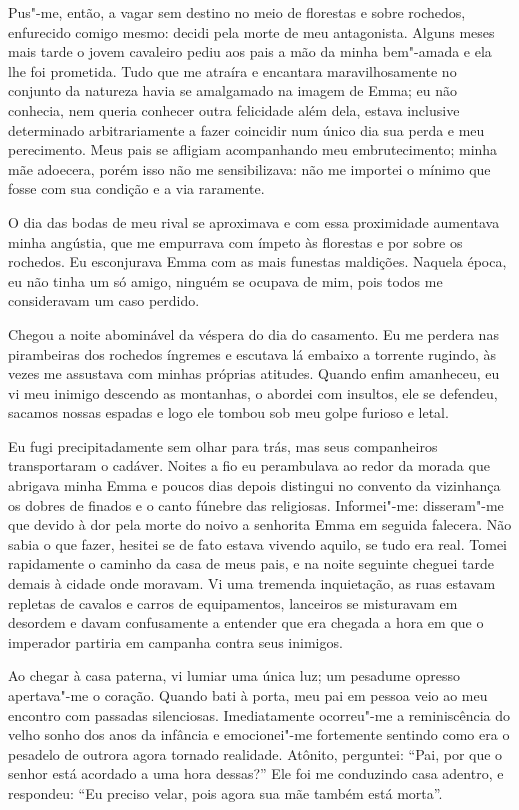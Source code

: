 Pus"-me, então, a vagar sem destino no meio de florestas e sobre
rochedos, enfurecido comigo mesmo: decidi pela morte de meu
antagonista. Alguns meses mais tarde o jovem cavaleiro pediu aos pais a
mão da minha bem"-amada e ela lhe foi prometida. Tudo que me atraíra e
encantara maravilhosamente no conjunto da natureza havia se amalgamado
na imagem de Emma; eu não conhecia, nem queria conhecer outra
felicidade além dela, estava inclusive determinado arbitrariamente a
fazer coincidir num único dia sua perda e meu perecimento. Meus pais se
afligiam acompanhando meu embrutecimento; minha mãe adoecera, porém
isso não me sensibilizava: não me importei o mínimo que fosse com sua
condição e a via raramente.

O dia das bodas de meu rival se aproximava e com essa proximidade
aumentava minha angústia, que me empurrava com ímpeto às florestas e
por sobre os rochedos. Eu esconjurava Emma com as mais funestas
maldições. Naquela época, eu não tinha um só amigo, ninguém se ocupava
de mim, pois todos me consideravam um caso perdido.

Chegou a noite abominável da véspera do dia do casamento. Eu me perdera nas
pirambeiras dos rochedos íngremes e escutava lá embaixo a torrente
rugindo, às vezes me assustava com minhas próprias atitudes. Quando
enfim amanheceu, eu vi meu inimigo descendo as montanhas, o abordei com
insultos, ele se defendeu, sacamos nossas espadas e logo ele tombou sob
meu golpe furioso e letal.

Eu fugi precipitadamente sem olhar para trás, mas seus companheiros
transportaram o cadáver. Noites a fio eu perambulava ao redor da morada
que abrigava minha Emma e poucos dias depois distingui no convento da
vizinhança os dobres de finados e o canto fúnebre das religiosas. 
Informei"-me: disseram"-me que devido à dor pela morte do noivo a senhorita
Emma em seguida falecera. Não sabia o que fazer, hesitei se de fato
estava vivendo aquilo, se tudo era real. Tomei rapidamente o caminho da
casa de meus pais, e na noite seguinte cheguei tarde demais à cidade
onde moravam. Vi uma tremenda inquietação, as ruas estavam repletas de
cavalos e carros de equipamentos, lanceiros se misturavam em desordem e
davam confusamente a entender que era chegada a hora em que o imperador
partiria em campanha contra seus inimigos.

Ao chegar à casa paterna, vi lumiar uma única luz; um pesadume opresso
apertava"-me o coração. Quando bati à porta, meu pai em pessoa veio ao
meu encontro com passadas silenciosas. Imediatamente ocorreu"-me a
reminiscência do velho sonho dos anos da infância e emocionei"-me
fortemente sentindo como era o pesadelo de outrora agora tornado
realidade. Atônito, \mbox{perguntei}: ``Pai, por que o senhor está acordado a
uma hora dessas?'' Ele foi me conduzindo casa adentro, e respondeu: ``Eu
preciso velar, pois agora sua mãe também está morta''.

